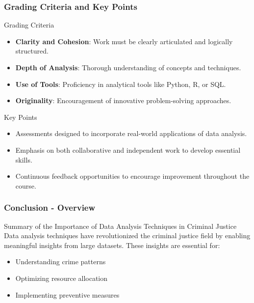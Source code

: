 \documentclass[aspectratio=169]{beamer}
\begin{document}
\begin{frame}[fragile]
    \frametitle{Grading Criteria and Key Points}
    \begin{block}{Grading Criteria}
        \begin{itemize}
            \item \textbf{Clarity and Cohesion}: Work must be clearly articulated and logically structured.
            \item \textbf{Depth of Analysis}: Thorough understanding of concepts and techniques.
            \item \textbf{Use of Tools}: Proficiency in analytical tools like Python, R, or SQL.
            \item \textbf{Originality}: Encouragement of innovative problem-solving approaches.
        \end{itemize}
    \end{block}

    \begin{block}{Key Points}
        \begin{itemize}
            \item Assessments designed to incorporate real-world applications of data analysis.
            \item Emphasis on both collaborative and independent work to develop essential skills.
            \item Continuous feedback opportunities to encourage improvement throughout the course.
        \end{itemize}
    \end{block}
\end{frame}

\begin{frame}[fragile]
  \frametitle{Conclusion - Overview}
  \begin{block}{Summary of the Importance of Data Analysis Techniques in Criminal Justice}
    Data analysis techniques have revolutionized the criminal justice field by enabling meaningful insights from large datasets. 
    These insights are essential for:
    \begin{itemize}
      \item Understanding crime patterns
      \item Optimizing resource allocation
      \item Implementing preventive measures
    \end{itemize}
  \end{block}
\end{frame}
\end{document}
